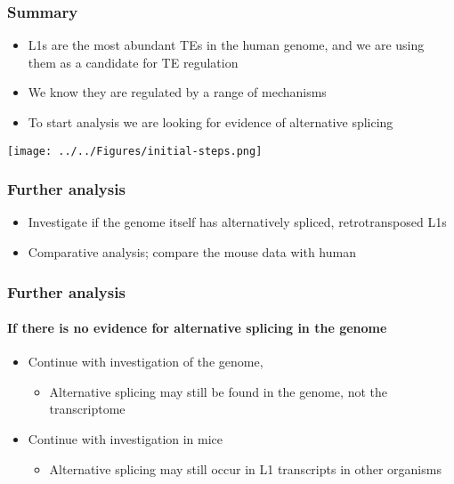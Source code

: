 \documentclass{beamer}
\begin{document}
		\begin{frame} %
			\frametitle{Summary}
			
			\begin{itemize}
				\item L1s are the most abundant TEs in the human genome, and we are using them as a candidate for TE regulation
				\item We know they are regulated by a range of mechanisms
				\item To start analysis we are looking for evidence of alternative splicing 
			\end{itemize}
			\texttt{[image: ../../Figures/initial-steps.png]}
		\end{frame}
		
		\begin{frame}
			\frametitle{Further analysis}
			\begin{itemize}
				\item Investigate if the genome itself has alternatively spliced, retrotransposed L1s
				\item Comparative analysis; compare the mouse data with human
			\end{itemize}
		\end{frame}
		
		\begin{frame}
			\frametitle{Further analysis}
			\framesubtitle{If there is no evidence for alternative splicing in the genome}
			\begin{itemize}
				\item Continue with investigation of the genome, 
				\begin{itemize}
					\item Alternative splicing may still be found in the genome, not the transcriptome
				\end{itemize}
				\item Continue with investigation in mice
				\begin{itemize}
					\item Alternative splicing may still occur in L1 transcripts in other organisms
				\end{itemize}	
			\end{itemize}
		\end{frame}		
%				
%				
%				
%					
		

\end{document}
